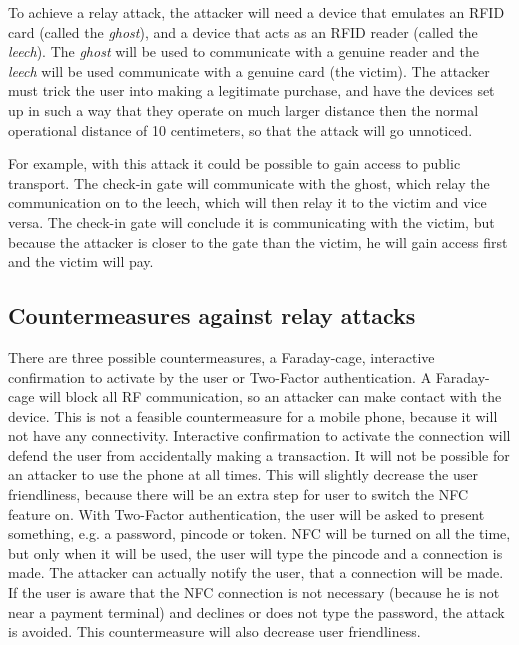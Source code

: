To achieve a relay attack, the attacker will need a device that emulates an RFID card (called the \textit{ghost}), and a device that acts as an RFID reader (called the \textit{leech}).
The \textit{ghost} will be used to communicate with a genuine reader and the \textit{leech} will be used communicate with a genuine card (the victim).
The attacker must trick the user into making a legitimate purchase, and have the devices set up in such a way that they operate on much larger distance then the normal operational distance of 10 centimeters, so that the attack will go unnoticed. \cite{1128470}

For example, with this attack it could be possible to gain access to public transport.
The check-in gate will communicate with the ghost, which relay the communication on to the leech, which will then relay it to the victim and vice versa.
The check-in gate will conclude it is communicating with the victim, but because the attacker is closer to the gate than the victim, he will gain access first and the victim will pay.

\subsection{Countermeasures against relay attacks}
There are three possible countermeasures, a Faraday-cage, interactive confirmation to activate by the user or Two-Factor authentication.
A Faraday-cage will block all RF communication, so an attacker can make contact with the device.
This is not a feasible countermeasure for a mobile phone, because it will not have any connectivity.
Interactive confirmation to activate the connection will defend the user from accidentally making a transaction.
It will not be possible for an attacker to use the phone at all times.
This will slightly decrease the user friendliness, because there will be an extra step for user to switch the NFC feature on.
With Two-Factor authentication, the user will be asked to present something, e.g. a password, pincode or token.
NFC will be turned on all the time, but only when it will be used, the user will type the pincode and a connection is made.
The attacker can actually notify the user, that a connection will be made.
If the user is aware that the NFC connection is not necessary (because he is not near a payment terminal) and declines or does not type the password, the attack is avoided.
This countermeasure will also decrease user friendliness. \cite{1128470}

